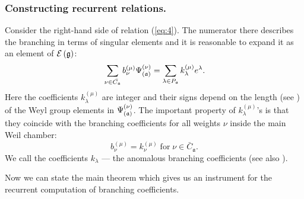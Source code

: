 \subsubsection{Constructing recurrent relations.}
\label{subsec:Construct-recurrent-rel}

Consider the right-hand side of relation (\ref{eq:4}).
The numerator there describes the branching in terms of singular elements and
it is reasonable to expand it as an element of $\mathcal{E}\left( \frak{g} \right)$:
\begin{equation}
  \label{eq:21}
  \sum_{\nu \in \bar{C_{\mathfrak{a}}}}b_{\nu }^{\left( \mu \right) }\Psi _{\left( \frak{%
        a}\right) }^{\left( \nu \right) }=\sum_{\lambda \in P_{\af}}k_{\lambda
  }^{\left( \mu \right) }e^{\lambda }.
\end{equation}
Here the coefficients $k_{\lambda}^{\left( \mu \right) }$ are integer and their signs
depend on the length (see \cite{humphreys1997introduction})  of the Weyl group elements in
$\Psi _{\left( \frak{a}\right) }^{\left( \nu \right) }$. The important property of
$k_{\lambda}^{\left( \mu \right) }$'s is that they coincide with the branching coefficients
for all weights $\nu$ inside the main Weil chamber:
\begin{equation}
  b^{(\mu)}_{\nu}=k^{(\mu)}_{\nu} \; \mbox{for} \; \nu\in \bar{C}_{\mathfrak{a}}.
\label{eq:21-1}
\end{equation}
We call the coefficients $k_{\lambda}$ --- the anomalous branching coefficients
(see also \cite{ilyin812pbc}).

Now we can state the main theorem which gives us an instrument for the
recurrent computation of branching coefficients.

